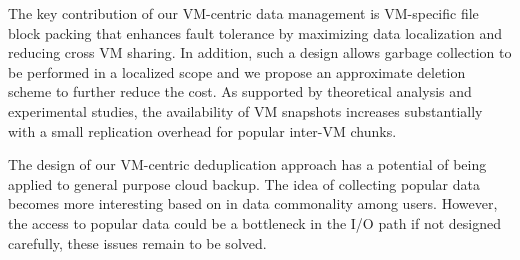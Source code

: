 The key contribution of our VM-centric data management is
VM-specific file block packing that enhances fault tolerance by
maximizing data localization and reducing cross VM sharing.
In addition, such a design allows garbage collection to be performed in a
localized scope and we propose an approximate deletion
scheme to further reduce the cost.
As supported by theoretical analysis and experimental studies,
the availability of VM snapshots increases substantially with a small
replication overhead for popular inter-VM chunks.

The design of our VM-centric deduplication approach has a potential of being applied
to general purpose cloud backup. The idea of collecting
popular data becomes more interesting based on in data commonality among users.
However, the access to popular data could be a bottleneck in the I/O path if not designed carefully,
these issues remain to be solved.
